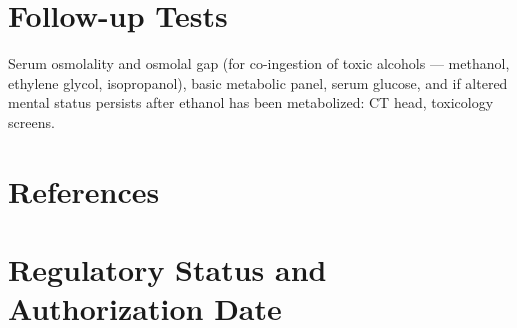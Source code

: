 \section*{Follow-up Tests}
Serum osmolality and osmolal gap (for co-ingestion of toxic alcohols --- methanol, ethylene glycol, isopropanol), basic metabolic panel, serum glucose, and if altered mental status persists after ethanol has been metabolized: CT head, toxicology screens.
\section*{References}


\clearpage
\section*{Regulatory Status and Authorization Date}

\clearpage
